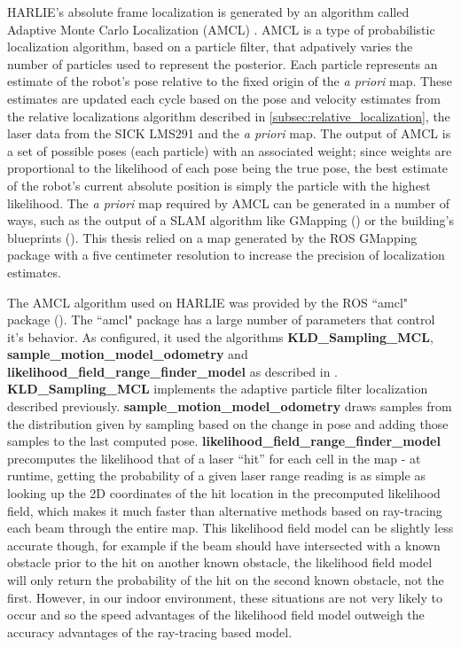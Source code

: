 HARLIE's absolute frame localization is generated by an algorithm called Adaptive Monte Carlo Localization (AMCL) \autocites{Dellaert_1999_533}{Fox01122003}{ProbRobotics}. AMCL is a type of probabilistic localization algorithm, based on a particle filter, that adpatively varies the number of particles used to represent the posterior. Each particle represents an estimate of the robot's pose relative to the fixed origin of the \emph{a priori} map. These estimates are updated each cycle based on the pose and velocity estimates from the relative localizations algorithm described in \autoref{subsec:relative_localization}, the laser data from the SICK LMS291 and the \emph{a priori} map. The output of AMCL is a set of possible poses (each particle) with an associated weight; since weights are proportional to the likelihood of each pose being the true pose, the best estimate of the robot's current absolute position is simply the particle with the highest likelihood. The \emph{a priori} map required by AMCL can be generated in a number of ways, such as the output of a SLAM algorithm like GMapping () or the building's blueprints (). This thesis relied on a map generated by the ROS GMapping package with a five centimeter resolution to increase the precision of localization estimates.

The AMCL algorithm used on HARLIE was provided by the ROS ``amcl" package (). The ``amcl" package has a large number of parameters that control it's behavior. As configured, it used the algorithms \textbf{KLD\_Sampling\_MCL}, \textbf{sample\_motion\_model\_odometry} and \textbf{likelihood\_field\_range\_finder\_model} as described in \autocite{ProbRobotics}. \textbf{KLD\_Sampling\_MCL} implements the adaptive particle filter localization described previously. \textbf{sample\_motion\_model\_odometry} draws samples from the distribution given by sampling based on the change in pose and adding those samples to the last computed pose. \textbf{likelihood\_field\_range\_finder\_model} precomputes the likelihood that of a laser ``hit'' for each cell in the map - at runtime, getting the probability of a given laser range reading is as simple as looking up the 2D coordinates of the hit location in the precomputed likelihood field, which makes it much faster than alternative methods based on ray-tracing each beam through the entire map. This likelihood field model can be slightly less accurate though, for example if the beam should have intersected with a known obstacle prior to the hit on another known obstacle, the likelihood field model will only return the probability of the hit on the second known obstacle, not the first. However, in our indoor environment, these situations are not very likely to occur and so the speed advantages of the likelihood field model outweigh the accuracy advantages of the ray-tracing based model.

